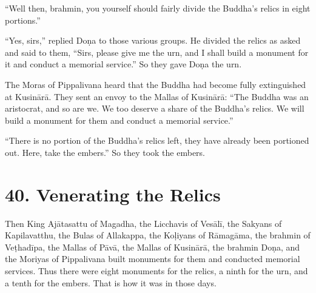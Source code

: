 \documentclass[12pt,openany]{book}%
\begin{document}
“Well then, brahmin, you yourself should fairly divide the Buddha’s relics in eight portions.” 

“Yes, sirs,” replied \textsanskrit{Doṇa} to those various groups. He divided the relics as asked and said to them, “Sirs, please give me the urn, and I shall build a monument for it and conduct a memorial service.” So they gave \textsanskrit{Doṇa} the urn. 

The Moras of Pippalivana heard that the Buddha had become fully extinguished at \textsanskrit{Kusinārā}. They sent an envoy to the Mallas of \textsanskrit{Kusinārā}: “The Buddha was an aristocrat, and so are we. We too deserve a share of the Buddha’s relics. We will build a monument for them and conduct a memorial service.” 

“There is no portion of the Buddha’s relics left, they have already been portioned out. Here, take the embers.” So they took the embers. 

\section*{40. Venerating the Relics }

Then King \textsanskrit{Ajātasattu} of Magadha, the Licchavis of \textsanskrit{Vesālī}, the Sakyans of Kapilavatthu, the Bulas of Allakappa, the \textsanskrit{Koḷiyans} of \textsanskrit{Rāmagāma}, the brahmin of \textsanskrit{Veṭhadīpa}, the Mallas of \textsanskrit{Pāvā}, the Mallas of \textsanskrit{Kusinārā}, the brahmin \textsanskrit{Doṇa}, and the Moriyas of Pippalivana built monuments for them and conducted memorial services. Thus there were eight monuments for the relics, a ninth for the urn, and a tenth for the embers. That is how it was in those days. 
\end{document}

